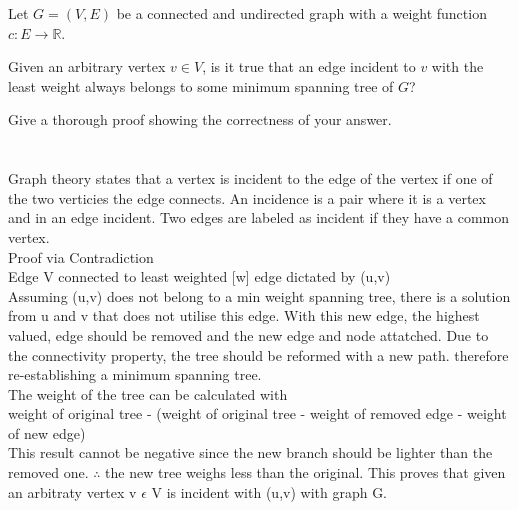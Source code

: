 \documentclass[11pt]{amsart}
\begin{document}
Let $G=(V,E)$ be a connected and undirected graph with a weight function $c\colon E \to \mathbb{R}$. \medskip

Given an arbitrary vertex $v\in V$, is it true that an edge incident to $v$ with the least weight always belongs to some minimum spanning tree of $G$?\medskip

Give a thorough proof showing the correctness of your answer. 
\\\\\\
Graph theory states that a vertex is incident to the edge of the vertex if one of the two verticies the edge connects. An incidence is a pair where it is a vertex and in an edge incident. Two edges are labeled as incident if they have a common vertex.\\Proof via Contradiction\\Edge V connected to least weighted [w] edge dictated by (u,v)\\Assuming (u,v) does not belong to a min weight spanning tree, there is a solution from u and v that does not utilise this edge. With this new edge, the highest valued, edge should be removed and the new edge and node attatched. Due to the connectivity property, the tree should be reformed with a new path. therefore re-establishing a minimum spanning tree. \\The weight of the tree can be calculated with \\
weight of original tree - (weight of original tree - weight of removed edge - weight of new edge)\\
This result cannot be negative since the new branch should be lighter than the removed one. $\therefore$ the new tree weighs less than the original. This proves that given an arbitraty vertex v $\epsilon $ V is incident with (u,v) with graph G.
\end{document}
